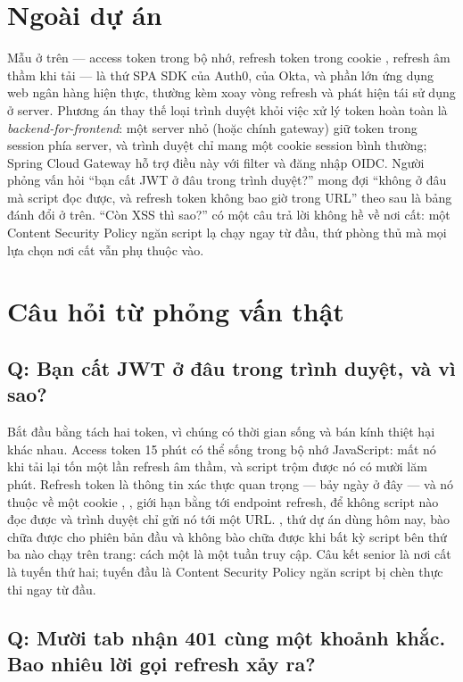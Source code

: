 \section{Ngoài dự án}

Mẫu ở trên --- access token trong bộ nhớ, refresh token trong cookie
, refresh âm thầm khi tải --- là thứ SPA SDK của Auth0,
của Okta, và phần lớn ứng dụng web ngân hàng hiện thực, thường kèm xoay
vòng refresh và phát hiện tái sử dụng ở server. Phương án thay thế loại
trình duyệt khỏi việc xử lý token hoàn toàn là
\emph{backend-for-frontend}: một server nhỏ (hoặc chính gateway) giữ
token trong session phía server, và trình duyệt chỉ mang một cookie
session bình thường; Spring Cloud Gateway hỗ trợ điều này với filter
 và đăng nhập OIDC. Người phỏng vấn hỏi ``bạn cất JWT
ở đâu trong trình duyệt?'' mong đợi ``không ở đâu mà script đọc được,
và refresh token không bao giờ trong URL'' theo sau là bảng đánh đổi ở
trên. ``Còn XSS thì sao?'' có một câu trả lời không hề về nơi cất: một
Content Security Policy ngăn script lạ chạy ngay từ đầu, thứ phòng thủ
mà mọi lựa chọn nơi cất vẫn phụ thuộc vào.

\section{Câu hỏi từ phỏng vấn thật}

\subsection*{Q: Bạn cất JWT ở đâu trong trình duyệt, và vì sao?}

Bắt đầu bằng tách hai token, vì chúng có thời gian sống và bán kính
thiệt hại khác nhau. Access token 15 phút có thể sống trong bộ nhớ
JavaScript: mất nó khi tải lại tốn một lần refresh âm thầm, và script
trộm được nó có mười lăm phút. Refresh token là thông tin xác thực
quan trọng --- bảy ngày ở đây --- và nó thuộc về một cookie
, ,  giới hạn bằng
 tới endpoint refresh, để không script nào đọc được và trình
duyệt chỉ gửi nó tới một URL. , thứ dự án dùng hôm
nay, bào chữa được cho phiên bản đầu và không bào chữa được khi bất kỳ
script bên thứ ba nào chạy trên trang: cách một  là
một tuần truy cập. Câu kết senior là nơi cất là tuyến thứ hai; tuyến
đầu là Content Security Policy ngăn script bị chèn thực thi ngay từ
đầu.

\subsection*{Q: Mười tab nhận 401 cùng một khoảnh khắc. Bao nhiêu lời gọi refresh xảy ra?}

